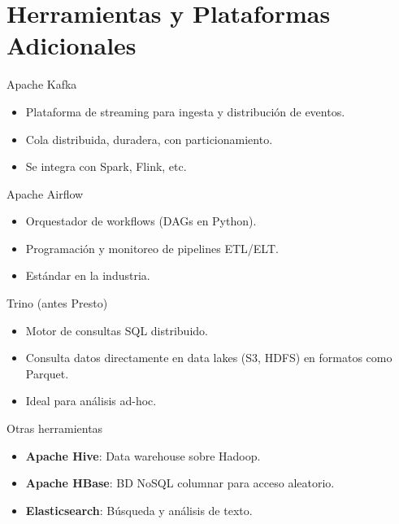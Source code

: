 \documentclass[aspectratio=169, 10pt, xcolor=table]{beamer}
\begin{document}
\section{Herramientas y Plataformas Adicionales}

\begin{frame}{Apache Kafka}
    \begin{itemize}
        \item Plataforma de streaming para ingesta y distribución de eventos.
        \item Cola distribuida, duradera, con particionamiento.
        \item Se integra con Spark, Flink, etc.
    \end{itemize}
\end{frame}

\begin{frame}{Apache Airflow}
    \begin{itemize}
        \item Orquestador de workflows (DAGs en Python).
        \item Programación y monitoreo de pipelines ETL/ELT.
        \item Estándar en la industria.
    \end{itemize}
\end{frame}

\begin{frame}{Trino (antes Presto)}
    \begin{itemize}
        \item Motor de consultas SQL distribuido.
        \item Consulta datos directamente en data lakes (S3, HDFS) en formatos como Parquet.
        \item Ideal para análisis ad-hoc.
    \end{itemize}
\end{frame}

\begin{frame}{Otras herramientas}
    \begin{itemize}
        \item \textbf{Apache Hive}: Data warehouse sobre Hadoop.
        \item \textbf{Apache HBase}: BD NoSQL columnar para acceso aleatorio.
        \item \textbf{Elasticsearch}: Búsqueda y análisis de texto.
    \end{itemize}
\end{frame}
\end{document}
